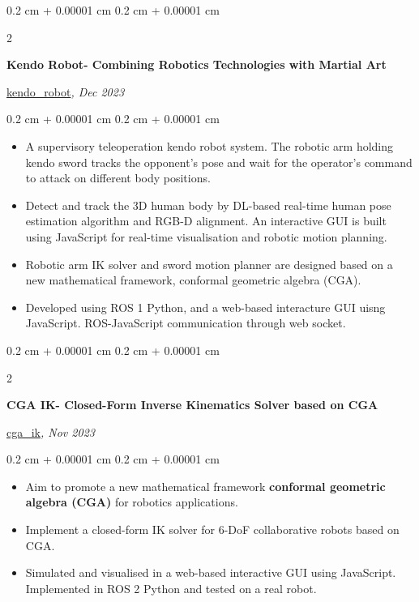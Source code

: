 \documentclass[10pt, letterpaper]{article}
\newenvironment{highlights}{
    \begin{itemize}[
        topsep=0.10 cm,
        parsep=0.10 cm,
        partopsep=0pt,
        itemsep=0pt,
        leftmargin=0.4 cm + 10pt
    ]
}{
    \end{itemize}
} %
\newenvironment{onecolentry}{
    \begin{adjustwidth}{
        0.2 cm + 0.00001 cm
    }{
        0.2 cm + 0.00001 cm
    }
}{
    \end{adjustwidth}
} %
\newenvironment{twocolentry}[2][]{
    \onecolentry
    \def\secondColumn{#2}
    \setcolumnwidth{\fill, 4.5 cm}
    \begin{paracol}{2}
}{
    \switchcolumn \raggedleft \secondColumn
    \end{paracol}
    \endonecolentry
} %
\let\hrefWithoutArrow\href
\renewcommand{\href}[2]{\hrefWithoutArrow{#1}{\ifthenelse{\equal{#2}{}}{ }{#2 }\raisebox{.15ex}{\footnotesize \faExternalLink*}}}
\begin{document}
        \vspace{0.2 cm}

        \begin{twocolentry}{
        \hrefWithoutArrow{https://github.com/wei-hsuan-cheng/kendo_robot}{{\footnotesize\faGithub}\hspace*{0.13cm}kendo\_robot}\textit{, Dec 2023}
        }
            \textbf{Kendo Robot- Combining Robotics Technologies with Martial Art}
        \end{twocolentry}
        \vspace{0.10 cm}
        \begin{onecolentry}
            \begin{highlights}
                \item A supervisory teleoperation kendo robot system. The robotic arm holding kendo sword tracks the opponent’s pose and wait for the operator’s command to attack on different body positions.
                \item Detect and track the 3D human body by DL-based real-time human pose estimation algorithm and RGB-D alignment. An interactive GUI is built using JavaScript for real-time visualisation and robotic motion planning.
                \item Robotic arm IK solver and sword motion planner are designed based on a new mathematical framework, conformal geometric algebra (CGA).
                \item Developed using ROS 1 Python, and a web-based interacture GUI uisng JavaScript. ROS-JavaScript communication through web socket.
            \end{highlights}
        \end{onecolentry}

        \vspace{0.2 cm}

        \begin{twocolentry}{
        \hrefWithoutArrow{https://github.com/wei-hsuan-cheng/cga_ik}{{\footnotesize\faGithub}\hspace*{0.13cm}cga\_ik}\textit{, Nov 2023}
        }
            \textbf{CGA IK- Closed-Form Inverse Kinematics Solver based on CGA}
        \end{twocolentry}
        \vspace{0.10 cm}
        \begin{onecolentry}
            \begin{highlights}
                \item Aim to promote a new mathematical framework \textbf{conformal geometric algebra (CGA)} for robotics applications. 
                \item Implement a closed-form IK solver for 6-DoF collaborative robots based on CGA.
                \item Simulated and visualised in a web-based interactive GUI using JavaScript. Implemented in  ROS 2 Python and tested on a real robot.
            \end{highlights}
        \end{onecolentry}
\end{document}
